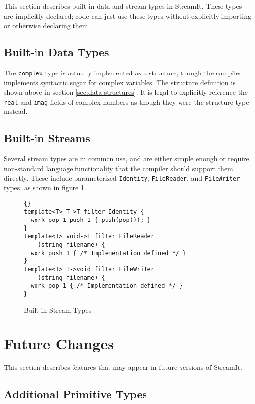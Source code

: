 \documentclass[11pt]{article}
\begin{document}
This section describes built in data and stream types in StreamIt.
These types are implicitly declared; code can just use these types
without explicitly importing or otherwise declaring them.

\subsection{Built-in Data Types}

The \lstinline|complex| type is actually implemented as a structure,
though the compiler implements syntactic sugar for complex variables.
The structure definition is shown above in section
\ref{sec:data-structures}.
It is legal to explicitly reference the \lstinline|real| and
\lstinline|imag| fields of complex numbers as though they were the
structure type instead.

\subsection{Built-in Streams}

Several stream types are in common use, and are either simple enough
or require non-standard language functionality that the compiler
should support them directly.  These include parameterized
\lstinline|Identity|, \lstinline|FileReader|, and \lstinline|FileWriter| types, as
shown in figure \ref{fig:built-in-streams}.

\begin{figure}[htbp]
    \begin{lstlisting}{}
template<T> T->T filter Identity {
  work pop 1 push 1 { push(pop()); }
}
template<T> void->T filter FileReader
    (string filename) {
  work push 1 { /* Implementation defined */ }
}
template<T> T->void filter FileWriter
    (string filename) {
  work pop 1 { /* Implementation defined */ }
}
\end{lstlisting}
    \caption{Built-in Stream Types}
    \label{fig:built-in-streams}
\end{figure}

\section{Future Changes}

This section describes features that may appear in future versions of
StreamIt.

\subsection{Additional Primitive Types}
\end{document}
